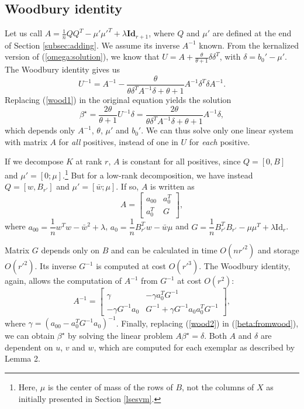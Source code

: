 \subsection{Woodbury identity}
Let us call $A=\frac{1}{n}QQ^T-\mu'\mu'^T+\lambda\textbf{Id}_{r+1}$, where $Q$ and $\mu'$ are defined at the end of Section \ref{subsec:adding}. We assume its inverse $A^{-1}$ known. From the kernalized version of (\ref{omega:solution}), we know that $U=A+\frac{\theta}{\theta+1}\delta\delta^T$, with $\delta=b_0'-\mu'$. The Woodbury identity gives us 
\begin{equation}
U^{-1}=A^{-1} -\dfrac{\theta}{\theta\delta^TA^{-1}\delta+ \theta+1}A^{-1}\delta^T\delta A^{-1}.\label{wood1}
\end{equation}
Replacing (\ref{wood1}) in the original equation yields the solution
\begin{equation}
\beta^\star = \dfrac{2\theta}{\theta+1}U^{-1}\delta = \dfrac{2\theta}{\theta\delta^TA^{-1}\delta+ \theta+1}A^{-1}\delta,\label{beta:fromwood}
\end{equation}
which depends only $A^{-1}$, $\theta$, $\mu'$ and $b_0'$. 
We can thus solve only one linear system with matrix $A$ for \textit{all} positives, instead of one in $U$ for \textit{each} positive.

If we decompose $K$ at rank $r$, $A$ is constant for all positives, since $Q = [0, B]$ and $\mu'=[0; \mu]$.\footnote{Here, $\mu$ is the center of mass of the rows of $B$, not the columns of $X$ as initially presented in Section \ref{lsesvm}.} 
But for a low-rank decomposition, we have instead $Q=[w, B_{r'}]$ and $\mu' = [\bar{w}; \mu]$. If so, $A$ is written as 
\begin{equation}
A = \begin{bmatrix}
a_{00} & a_0^T\\
a_0^T & G
\end{bmatrix},
\end{equation}
where $a_{00}=\dfrac{1}{n}w^Tw-\bar{w}^2+\lambda$, $a_0 = \dfrac{1}{n}B_{r'}^Tw-\bar{w}\mu$ and $G=\dfrac{1}{n}B_{r'}^TB_{r'}-\mu\mu^T+\lambda\text{Id}_r$.

Matrix $G$ depends only on $B$ and can be calculated in time $O(nr'^2)$ and storage $O(r'^2)$. 
Its inverse $G^{-1}$ is computed at cost $O(r'^3)$.
The Woodbury identity, again, allows the computation of $A^{-1}$ from $G^{-1}$ at cost $O(r^2)$:
\begin{equation}
A^{-1} = \begin{bmatrix}\gamma & -\gamma a_0^TG^{-1}\\ -\gamma G^{-1}a_0 & G^{-1}+\gamma G^{-1}a_0a_0^TG^{-1}\end{bmatrix},\label{wood2}
\end{equation}
where $\gamma = \left(a_{00}-a_0^TG^{-1}a_0\right)^{-1}$. Finally, replacing (\ref{wood2}) in (\ref{beta:fromwood}), we can obtain $\beta^\star$ by solving the linear problem $A\beta^\star = \delta$. 
Both $A$ and $\delta$ are dependent on $u$, $v$ and $w$, which are computed for each exemplar as described by Lemma 2.

